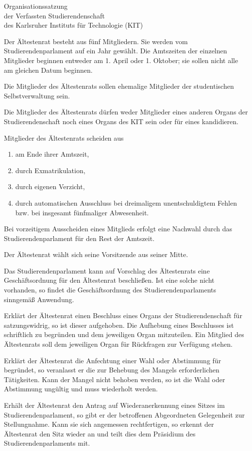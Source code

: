 \begin{jurdoc}[Organisationssatzung]{Organisationssatzung\\der Verfassten Studierendenschaft\\des Karlsruher Instituts für Technologie (KIT)}

Der Ältestenrat besteht aus fünf Mitgliedern. Sie werden vom Studierendenparlament auf ein Jahr gewählt. Die Amtszeiten der einzelnen Mitglieder beginnen entweder am 1. April oder 1. Oktober; sie sollen nicht alle am gleichen Datum beginnen.

Die Mitglieder des Ältestenrats sollen ehemalige Mitglieder der studentischen Selbstverwaltung sein.

Die Mitglieder des Ältestenrats dürfen weder Mitglieder eines anderen Organs der Studierendenschaft noch eines Organs des KIT sein oder für eines kandidieren.

Mitglieder des Ältestenrats scheiden aus
  \begin{enumerate}
  \item am Ende ihrer Amtszeit,
  \item durch Exmatrikulation,
  \item durch eigenen Verzicht,
  \item durch automatischen Ausschluss bei dreimaligem unentschuldigtem Fehlen bzw. bei insgesamt fünfmaliger Abwesenheit.
  \end{enumerate}
Bei vorzeitigem Ausscheiden eines Mitglieds erfolgt eine Nachwahl durch das Studierendenparlament für den Rest der Amtszeit.



Der Ältestenrat wählt sich seine Vorsitzende aus seiner Mitte.

Das Studierendenparlament kann auf Vorschlag des Ältestenrats eine Geschäftsordnung für den Ältestenrat beschließen. Ist eine solche nicht vorhanden, so findet die Ge\-schäfts\-ord\-nung des Studierendenparlaments sinngemäß Anwendung.



Erklärt der Ältestenrat einen Beschluss eines Organs der Studierendenschaft für satzungswidrig, so ist dieser aufgehoben. Die Aufhebung eines Beschlusses ist schriftlich zu begründen und dem jeweiligen Organ mitzuteilen. Ein Mitglied des Ältestenrats soll dem jeweiligen Organ für Rückfragen zur Verfügung stehen.

Erklärt der Ältestenrat die Anfechtung einer Wahl oder Abstimmung für begründet, so veranlasst er die zur Behebung des Mangels erforderlichen Tätigkeiten. Kann der Mangel nicht behoben werden, so ist die Wahl oder Abstimmung ungültig und muss wiederholt werden.

Erhält der Ältestenrat den Antrag auf Wiederanerkennung eines Sitzes im Studierendenparlament, so gibt er der betroffenen Abgeordneten Gelegenheit zur Stellungnahme. Kann sie sich angemessen rechtfertigen, so erkennt der Ältestenrat den Sitz wieder an und teilt dies dem Präsidium des Studierendenparlaments mit.


\end{jurdoc}
